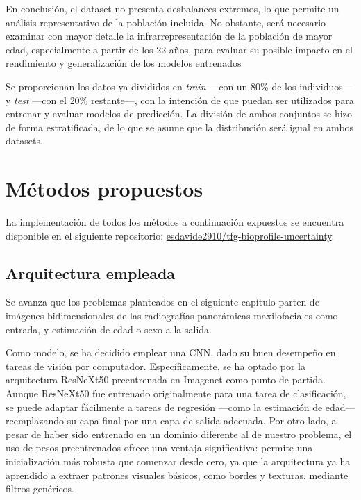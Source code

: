 En conclusión, el dataset no presenta desbalances extremos, lo que permite un análisis representativo de la población incluida. No obstante, será necesario examinar con mayor detalle la infrarrepresentación de la población de mayor edad, especialmente a partir de los 22 años, para evaluar su posible impacto en el rendimiento y generalización de los modelos entrenados

Se proporcionan los datos ya divididos en \textit{train} ---con un 80\% de los individuos--- y \textit{test} ---con el 20\% restante---, con la intención de que puedan ser utilizados para entrenar y evaluar modelos de predicción. La división de ambos conjuntos se hizo de forma estratificada, de lo que se asume que la distribución será igual en ambos datasets. 

\FloatBarrier



\section{Métodos propuestos}

La implementación de todos los métodos a continuación expuestos se encuentra disponible en el siguiente repositorio: \href{https://github.com/esdavide2910/tfg-bioprofile-uncertainty}{esdavide2910/tfg-bioprofile-uncertainty}.

\subsection{Arquitectura empleada}

Se avanza que los problemas planteados en el siguiente capítulo parten de imágenes bidimensionales de las radiografías panorámicas maxilofaciales como entrada, y estimación de edad o sexo a la salida.

Como modelo, se ha decidido emplear una CNN, dado su buen desempeño en tareas de visión por computador. Específicamente, se ha optado por la arquitectura ResNeXt50 \cite{xie2017} preentrenada en Imagenet \cite{deng2009} como punto de partida. Aunque ResNeXt50 fue entrenado originalmente para una tarea de clasificación, se puede adaptar fácilmente a tareas de regresión ---como la estimación de edad--- reemplazando su capa final por una capa de salida adecuada. Por otro lado, a pesar de haber sido entrenado en un dominio diferente al de nuestro problema, el uso de pesos preentrenados ofrece una ventaja significativa: permite una inicialización más robusta que comenzar desde cero, ya que la arquitectura ya ha aprendido a extraer patrones visuales básicos, como bordes y texturas, mediante filtros genéricos.

